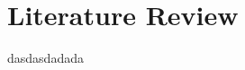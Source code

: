 \renewcommand{\baselinestretch}{1.5}\normalsize
\chapter{Literature Review}


\label{Chapter Literature Review}
	
dasdasdadada
